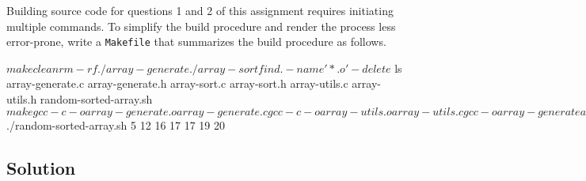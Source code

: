 \documentclass[12pt,letterpaper,twoside]{article}
\begin{document}
Building source code for questions 1 and 2 of this assignment requires initiating multiple commands.
To simplify the build procedure and render the process less error-prone, write a \texttt{Makefile} that summarizes the build procedure as follows.

\begin{terminal}
$ make clean
rm -rf ./array-generate ./array-sort
find . -name '*.o' -delete
$ ls
array-generate.c array-generate.h array-sort.c array-sort.h
array-utils.c array-utils.h random-sorted-array.sh
$ make
gcc -c -o array-generate.o array-generate.c
gcc -c -o array-utils.o array-utils.c
gcc -o array-generate array-generate.o array-utils.o -Werror -Wall -std=gnu99 -I.
gcc -c -o array-sort.o array-sort.c
gcc -o array-sort array-sort.o array-utils.o -Werror -Wall -std=gnu99 -I.
$ ./random-sorted-array.sh
5 12 16 17 17 19 20
\end{terminal}

\subsection*{Solution}

\lstset{language=bash,tabsize=4}

\end{document}

